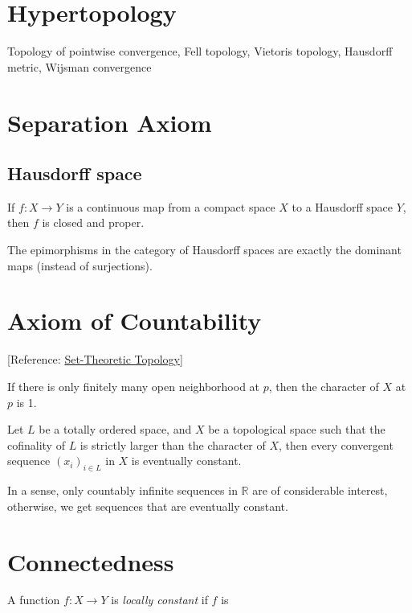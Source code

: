 \documentclass{treatise}
\begin{document}
\begin{shaded}
\section{Hypertopology}
Topology of pointwise convergence, Fell topology, Vietoris topology, Hausdorff metric, Wijsman convergence

\section{Separation Axiom}
\subsection{Hausdorff space}
\begin{theorem}
If $f: X \to Y$ is a continuous map from a compact space $X$ to a Hausdorff space $Y$, then $f$ is closed and proper.
\end{theorem}
\begin{proposition}
The epimorphisms in the category of Hausdorff spaces are exactly the dominant maps (instead of surjections).
\end{proposition}

\section{Axiom of Countability}
{[Reference: \hyperref[https://en.wikipedia.org/wiki/Set-theoretic_topology]{Set-Theoretic Topology}]}
\begin{remark}
If there is only finitely many open neighborhood at $p$, then the character of $X$ at $p$ is 1.
\end{remark}
\begin{proposition}
Let $L$ be a totally ordered space, and $X$ be a topological space such that the cofinality of $L$ is strictly larger than the character of $X$, then every convergent sequence $(x_i)_{i \in L}$ in $X$ is eventually constant.
\end{proposition}
\begin{remark}
In a sense, only countably infinite sequences in $\mathbb{R}$ are of considerable interest, otherwise, we get sequences that are eventually constant.
\end{remark}

\section{Connectedness}
A function $f: X \to Y$ is \emph{locally constant} if $f$ is


\end{shaded}
\end{document}

